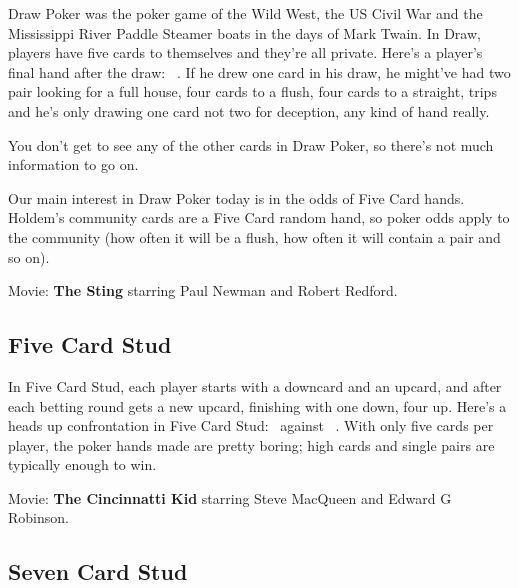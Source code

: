 Draw Poker was the poker game of the Wild West, the US Civil War and
the Mississippi River Paddle Steamer boats in the days of Mark Twain.
In Draw, players have five cards to themselves and they're
all private. Here's a player's final hand after the draw:
\back\back\back\back\back\ . If he drew one card in his draw,
he might've had two pair looking for a full house, four cards to a
flush, four cards to a straight, trips and he's only drawing one card
not two for deception, any kind of hand really.

You don't get to see any of the other cards in Draw Poker, so there's
not much information to go on.

Our main interest in Draw Poker today is in the odds of Five Card
hands. Holdem's community cards are a Five Card random hand, so poker
odds apply to the community (how often it will be a flush, how often
it will contain a pair and so on).

Movie: \textbf{The Sting} starring Paul Newman and Robert Redford.

\subsection{Five Card Stud}

In Five Card Stud, each player starts with a downcard and an upcard,
and after each betting round gets a new upcard, finishing with one
down, four up. Here's a heads up confrontation in Five Card Stud:
\back\nines\Qc\Jc\tred\ against \back\fourh\Jh\tend\trec\ . With
only five cards per player, the poker hands made are pretty boring;
high cards and single pairs are typically enough to win.


Movie: \textbf{The Cincinnatti Kid} starring Steve MacQueen and Edward G
Robinson.

\subsection{Seven Card Stud}

